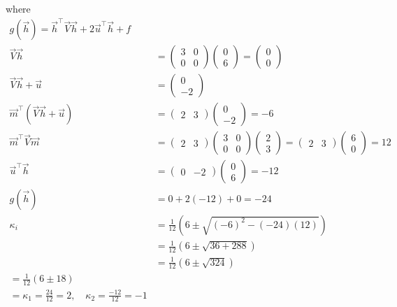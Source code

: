 \documentclass[journal]{IEEEtran}
\begin{document}
where
\begin{align}
    g(\vec{h}) = \vec{h}^\top \vec{V} \vec{h} 
+ 2\vec{u}^\top \vec{h} + f\\
\vec{V}\vec{h} &= \begin{pmatrix} 3 & 0 \\ 0 & 0 \end{pmatrix}
\begin{pmatrix} 0 \\ 6 \end{pmatrix} = \begin{pmatrix} 0 \\ 0 \end{pmatrix} \\
\vec{V}\vec{h} + \vec{u} &= \begin{pmatrix} 0 \\ -2 \end{pmatrix} \\
\vec{m}^\top (\vec{V}\vec{h} + \vec{u}) &= 
\begin{pmatrix} 2 & 3 \end{pmatrix} \begin{pmatrix} 0 \\ -2 \end{pmatrix} 
= -6 \\
\vec{m}^\top \vec{V} \vec{m} &= 
\begin{pmatrix} 2 & 3 \end{pmatrix} 
\begin{pmatrix} 3 & 0 \\ 0 & 0 \end{pmatrix} 
\begin{pmatrix} 2 \\ 3 \end{pmatrix} = 
\begin{pmatrix} 2 & 3 \end{pmatrix} \begin{pmatrix} 6 \\ 0 \end{pmatrix} = 12 \\
\vec{u}^\top \vec{h} &= 
\begin{pmatrix} 0 & -2 \end{pmatrix} \begin{pmatrix} 0 \\ 6 \end{pmatrix} = -12 \\
g(\vec{h}) &= 0 + 2(-12) + 0 = -24\\
\kappa_i &= \frac{1}{12} \left(6 \pm \sqrt{(-6)^2 - (-24)(12)}\right) \\
&= \frac{1}{12} \left(6 \pm \sqrt{36 + 288}\right) \\
&= \frac{1}{12} \left(6 \pm \sqrt{324}\right)\\ 
=\frac{1}{12} (6 \pm 18)\\
= \kappa_1 = \frac{24}{12} = 2, \quad 
\kappa_2 = \frac{-12}{12} = -1
\end{align}
\end{document}

